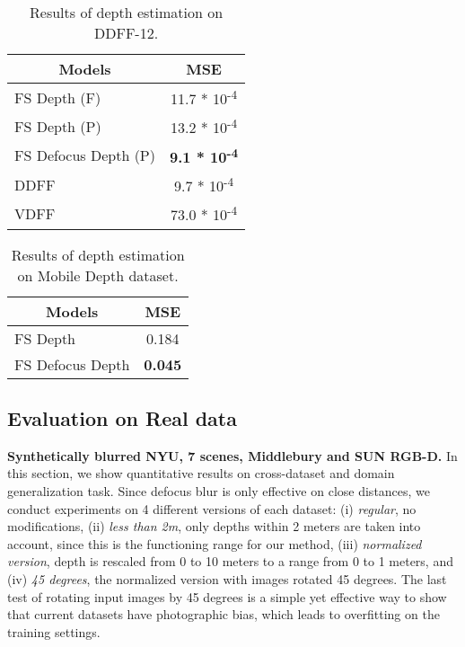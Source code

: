 \documentclass[10pt,twocolumn,letterpaper]{article}
\begin{document}
\begin{table}[]
\begin{center}
\begin{tabular}{l|c}
\hline
\multicolumn{1}{c|}{Models}      & MSE                 \\ \hline
FS  Depth (F)          & 11.7 * 10\textsuperscript{-4}          \\
FS  Depth (P)            & 13.2 * 10\textsuperscript{-4} \\
FS  Defocus  Depth (P) & \textbf{9.1 * 10\textsuperscript{-4}}          \\
DDFF \cite{Hazirbas18} & 9.7 * 10\textsuperscript{-4}    \\
VDFF \cite{Moeller2015} & 73.0 * 10\textsuperscript{-4}            \\\hline
\end{tabular}
\end{center}
\vspace{-0.2cm}
\caption{Results of depth estimation on DDFF-12.}
\label{table:RealDDFF}
\end{table} \begin{table}[]
\begin{center}
\begin{tabular}{l|c}
\hline
\multicolumn{1}{c|}{Models}    & MSE         \\ \hline
FS  Depth            & 0.184          \\
FS  Defocus  Depth & \textbf{0.045} \\ \hline
\end{tabular}
\end{center}
\vspace{-0.2cm}
\caption{Results of depth estimation on Mobile Depth dataset.}
\label{table:RealMobileDepth}
\end{table} 
\vspace{-1em}
\subsection{Evaluation on Real data}


\noindent\textbf{Synthetically blurred NYU, 7 scenes, Middlebury and SUN RGB-D.}
In this section, we show quantitative results on cross-dataset and domain generalization task. 
Since defocus blur is only effective on close distances, we conduct experiments on 4 different versions of each dataset: (i) {\it regular}, no modifications, (ii) {\it less than 2m}, only depths within 2 meters are taken into account, since this is the functioning range for our method, (iii) {\it normalized version}, depth is rescaled from 0 to 10 meters to a range from 0 to 1 meters, and (iv) {\it 45 degrees}, the normalized version with images rotated 45 degrees. 
The last test of rotating input images by 45 degrees is a simple yet effective way to show that current datasets have photographic bias, which leads to overfitting on the training settings.
\end{document}
